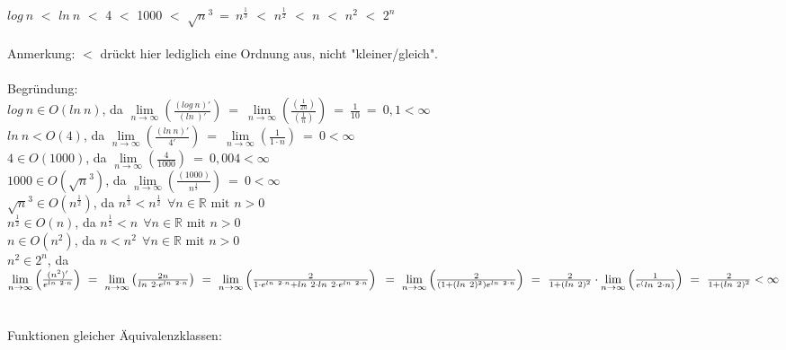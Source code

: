 \documentclass[fleqn]{article}
\newcommand{\R}{\mathbb{R}}
\begin{document}
\section{}%
\subsection{}%
$log ~ n$ $<$ $ln ~ n$ $<$ 4 $<$ 1000 $<$ $\sqrt{n}^3 ~=~ n^\frac{1}{3}$ $<$ $n^{\frac{1}{2}}$ $<$ $n$ $<$ $n^2$ $<$ $2^n$ \\
\\
Anmerkung: $<$ drückt hier lediglich eine Ordnung aus, nicht "kleiner/gleich".\\
\\
Begründung:\\
$log ~ n \in O(ln ~ n)$, da $\lim\limits_{n \to \infty}
        \left(
            \frac{(log ~ n)'}{(ln ~ )'}
        \right)
    ~=~ \lim\limits_{n \to \infty}
        \left(
            \frac{
                \left(\frac{1}{2n}\right)}{
                \left(\frac{1}{n}\right)
            }
        \right)
    ~=~ \frac{1}{10} ~=~ 0,1 < \infty$ \\
$ln ~ n < O(4)$, da $\lim\limits_{n \to \infty}
        \left(
            \frac{(ln ~ n)'}{4'}
        \right)
    ~=~ \lim\limits_{n \to \infty}
        \left(
            \frac{1}{1 \cdot n}
        \right)
    ~=~ 0 < \infty$ \\
$4 \in O(1000)$, da $\lim\limits_{n \to \infty}
        \left(
            \frac{4}{1000}
        \right)
    ~=~ 0,004 < \infty$ \\
$1000 \in O(\sqrt{n}^3)$, da $\lim\limits_{n \to \infty}
    \left(
        \frac{(1000)}{n^\frac{1}{3}}
    \right)
    ~=~ 0 < \infty$\\
$\sqrt{n}^3 \in O(n^\frac{1}{2})$, da $n^\frac{1}{3} < n^\frac{1}{2} ~~ \forall n \in \R \text{ mit $n > 0$}$\\
$n^\frac{1}{2} \in O(n)$, da $n^\frac{1}{2} < n ~~ \forall n \in \R \text{ mit $n > 0$}$\\
$n \in O(n^2)$, da $n < n^2 ~~ \forall n \in \R \text{ mit $n > 0$}$\\
$n^2 \in 2^n$, da 
\begin{math}
    \lim\limits_{n \to \infty}
        \left(
            \frac{(n^2)'}{e^{ln ~ 2 \cdot n}}
        \right)
    ~=~ \lim\limits_{n \to \infty}
        \left(
            \frac{2n}{ln ~ 2 \cdot e^{ln ~ 2 \cdot n}}
        \right)
    ~=~ \lim\limits_{n \to \infty}
        \left(
            \frac{2}{1 \cdot e^{ln ~ 2 \cdot n} + ln ~ 2 \cdot ln ~ 2 \cdot e^{ln ~ 2 \cdot n}}
        \right)\\
    ~=~ \lim\limits_{n \to \infty}
        \left(
            \frac{2}{(1 + (ln ~ 2)^2) e^{ln ~ 2 \cdot n}}
        \right)
    ~=~ \frac{2}{1 + (ln ~ 2)^2} \cdot \lim\limits_{n \to \infty}
        \left(
            \frac{1}{e^(ln ~ 2 \cdot n)}
        \right)
    ~=~ \frac{2}{1 + (ln ~ 2)^2} < \infty
\end{math}
\\
\\
\\
Funktionen gleicher Äquivalenzklassen:\\
\end{document}
